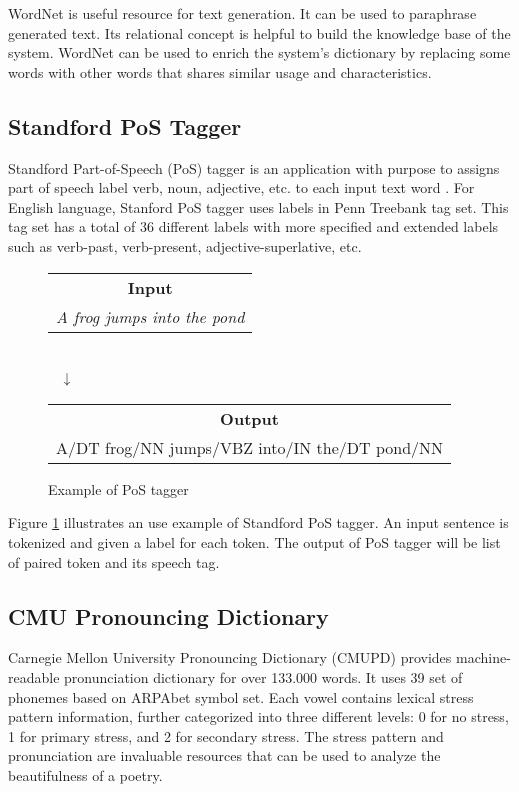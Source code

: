 WordNet is useful resource for text generation. It can be used to paraphrase generated text. Its relational concept is helpful to build the knowledge base of the system. WordNet can be used to enrich the system's dictionary by replacing some words with other words that shares similar usage and characteristics.

\subsection{Standford PoS Tagger}

Standford Part-of-Speech (PoS) tagger is an application with purpose to assigns part of speech label verb, noun, adjective, etc. to each input text word \cite{toutanova2003feature}. For English language, Stanford PoS tagger uses labels in Penn Treebank tag set. This tag set has a total of 36 different labels with more specified and extended labels such as verb-past, verb-present, adjective-superlative, etc\cite{marcus1993building}.

\begin{figure}[h]
	\centering
	\begin{tabular}{c}
		\textbf{Input} \\
		 \textit{A frog jumps into the pond }\\
		 
	\end{tabular} 
	\\~
	$\downarrow$
	~
	\\
	\begin{tabular}{c}
	\textbf{Output} \\
	 A/DT frog/NN jumps/VBZ into/IN the/DT pond/NN \\
	 
	\end{tabular} 
	
	\caption{Example of PoS tagger}
	\label{PoSexample}
\end{figure}

Figure \ref{PoSexample} illustrates an use example of Standford PoS tagger. An input sentence is tokenized and given a label for each token. The output of PoS tagger will be list of paired token and its speech tag.

\subsection{CMU Pronouncing Dictionary}

Carnegie Mellon University Pronouncing Dictionary (CMUPD) provides machine-readable pronunciation dictionary for over 133.000 words. It uses 39 set of phonemes based on ARPAbet symbol set. Each vowel contains lexical stress pattern information, further categorized into three different levels: 0 for no stress, 1 for primary stress, and 2 for secondary stress\cite{CMUDict}. The stress pattern and pronunciation are invaluable resources that can be used to analyze the beautifulness of a poetry.

